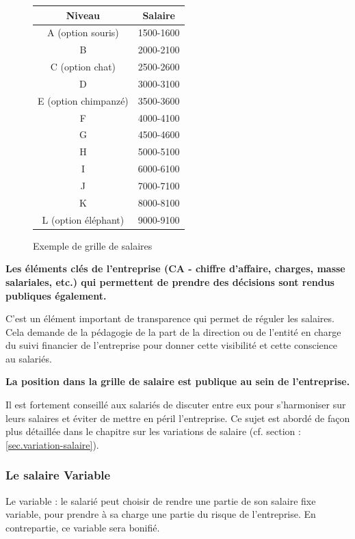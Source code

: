 \documentclass[12pt]{article}
\newcommand{\regle}[1]{%
  \begin{tcolorbox}[colframe=DarkOrange,boxrule=2pt,arc=4pt,left=6pt,right=6pt,top=6pt,bottom=6pt,boxsep=0pt,colback=LightOrange]
  \textbf{#1}
  \end{tcolorbox}
}
\begin{document}
\begin{figure}
  \begin{center}
  \begin{tabular}{| c | c |}
    \hline
    Niveau & Salaire \\ 
    \hline
    A (option souris) & 1500-1600 \\
    \hline
    B & 2000-2100 \\
    \hline
    C (option chat) & 2500-2600 \\
    \hline
    D & 3000-3100 \\
    \hline
    E (option chimpanzé) & 3500-3600 \\
    \hline
    F & 4000-4100 \\
    \hline
    G & 4500-4600 \\
    \hline
    H & 5000-5100 \\
    \hline
    I & 6000-6100 \\
    \hline
    J & 7000-7100 \\
    \hline
    K & 8000-8100 \\
    \hline
    L (option éléphant) & 9000-9100 \\
    \hline
  \end{tabular}
  \end{center}
  \caption{Exemple de grille de salaires}
  \label{grille}
\end{figure}

\regle{Les éléments clés de l’entreprise (CA - chiffre d’affaire, charges, masse salariales, etc.) qui permettent de prendre des décisions sont rendus publiques également.}

 C’est un élément important de transparence qui permet de réguler les salaires. Cela demande de la pédagogie de la part de la direction ou de l’entité en charge du suivi financier de l’entreprise pour donner cette visibilité et cette conscience au salariés.

 \regle{La position dans la grille de salaire est publique au sein de l’entreprise.}

 Il est fortement conseillé aux salariés de discuter entre eux pour s’harmoniser sur leurs salaires et éviter de mettre en péril l’entreprise\cite{Gore}. Ce sujet est abordé de façon plus détaillée dans le chapitre sur les variations de salaire (cf. section : \ref{sec.variation-salaire}).

 \subsubsection{Le salaire Variable}
 Le variable : le salarié peut choisir de rendre une partie de son salaire fixe variable, pour prendre à sa charge une partie du risque de l’entreprise. En contrepartie, ce variable sera bonifié. 
\end{document}
